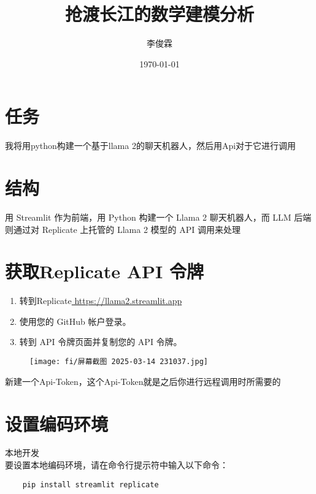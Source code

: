 \documentclass{article}
\title{抢渡长江的数学建模分析}
\author{李俊霖}
\date{\today}
\begin{document}
\maketitle

\section{任务}
我将用python构建一个基于llama 2的聊天机器人，然后用Api对于它进行调用
\section{结构}
用 Streamlit 作为前端，用 Python 构建一个 Llama 2 聊天机器人，而 LLM 后端则通过对 Replicate 上托管的 Llama 2 模型的 API 调用来处理
\section{获取Replicate API 令牌}
\begin{enumerate}[(1)]
    \item 转到Replicate\href {https://llama2.streamlit.app}{ https://llama2.streamlit.app}
    \item 使用您的 GitHub 帐户登录。
    \item 转到 API 令牌页面并复制您的 API 令牌。
\end{enumerate}
\begin{figure}[h]
    \centering
    \texttt{[image: fi/屏幕截图 2025-03-14 231037.jpg]}
\end{figure}
新建一个Api-Token，这个Api-Token就是之后你进行远程调用时所需要的 
\section{设置编码环境}
本地开发
\\ \indent 要设置本地编码环境，请在命令行提示符中输入以下命令：

\begin{lstlisting}
    pip install streamlit replicate
\end{lstlisting}
\end{document}
